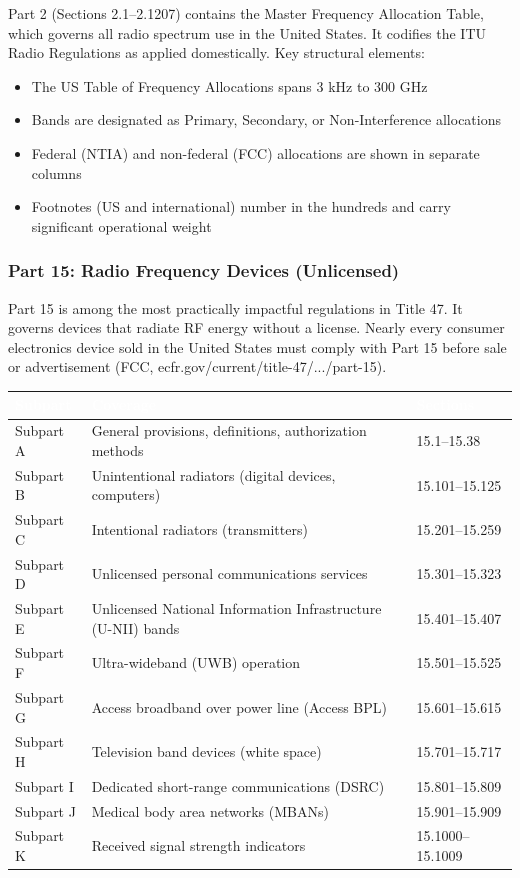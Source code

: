 \documentclass[11pt,letterpaper]{article}
\newcommand{\tableheader}[1]{\textbf{\sffamily\textcolor{white}{#1}}}
\begin{document}
Part 2 (Sections 2.1--2.1207) contains the Master Frequency Allocation Table, which governs all radio spectrum use in the United States. It codifies the ITU Radio Regulations as applied domestically. Key structural elements:
\begin{itemize}[leftmargin=1.5em]
  \item The US Table of Frequency Allocations spans 3 kHz to 300 GHz
  \item Bands are designated as Primary, Secondary, or Non-Interference allocations
  \item Federal (NTIA) and non-federal (FCC) allocations are shown in separate columns
  \item Footnotes (US and international) number in the hundreds and carry significant operational weight
\end{itemize}

\subsubsection{Part 15: Radio Frequency Devices (Unlicensed)}

Part 15 is among the most practically impactful regulations in Title 47. It governs devices that radiate RF energy without a license. Nearly every consumer electronics device sold in the United States must comply with Part 15 before sale or advertisement (FCC, ecfr.gov/current/title-47/.../part-15).

\begin{center}
\begin{tabularx}{\textwidth}{L{3cm}XC{3cm}}
\toprule
{}
\tableheader{Subpart} & \tableheader{Coverage} & \tableheader{Sections} \\
\midrule
Subpart A & General provisions, definitions, authorization methods & 15.1--15.38 \\
Subpart B & Unintentional radiators (digital devices, computers) & 15.101--15.125 \\
Subpart C & Intentional radiators (transmitters) & 15.201--15.259 \\
Subpart D & Unlicensed personal communications services & 15.301--15.323 \\
Subpart E & Unlicensed National Information Infrastructure (U-NII) bands & 15.401--15.407 \\
Subpart F & Ultra-wideband (UWB) operation & 15.501--15.525 \\
Subpart G & Access broadband over power line (Access BPL) & 15.601--15.615 \\
Subpart H & Television band devices (white space) & 15.701--15.717 \\
Subpart I & Dedicated short-range communications (DSRC) & 15.801--15.809 \\
Subpart J & Medical body area networks (MBANs) & 15.901--15.909 \\
Subpart K & Received signal strength indicators & 15.1000--15.1009 \\
\bottomrule
\end{tabularx}
\end{center}
\end{document}
